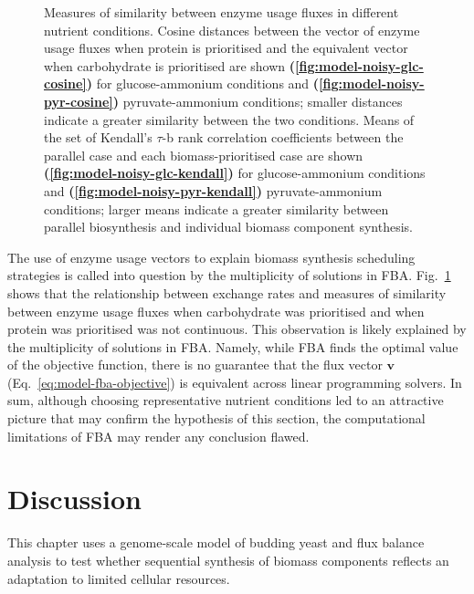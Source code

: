 \begin{figure}
  \caption[
    Measures of similarity between enzyme usage fluxes in different nutrient conditions
  ]{
    Measures of similarity between enzyme usage fluxes in different nutrient conditions.
    Cosine distances between the vector of enzyme usage fluxes when protein is prioritised and the equivalent vector when carbohydrate is prioritised are shown \textbf{(\ref{fig:model-noisy-glc-cosine})} for glucose-ammonium conditions and \textbf{(\ref{fig:model-noisy-pyr-cosine})} pyruvate-ammonium conditions; smaller distances indicate a greater similarity between the two conditions.
    Means of the set of Kendall's $\tau$-b rank correlation coefficients between the parallel case and each biomass-prioritised case are shown \textbf{(\ref{fig:model-noisy-glc-kendall})} for glucose-ammonium conditions and \textbf{(\ref{fig:model-noisy-pyr-kendall})} pyruvate-ammonium conditions; larger means indicate a greater similarity between parallel biosynthesis and individual biomass component synthesis.
    }
  \label{fig:model-noisy}
\end{figure}

The use of enzyme usage vectors to explain biomass synthesis scheduling strategies is called into question by the multiplicity of solutions in FBA.
Fig.\ \ref{fig:model-noisy} shows that the relationship between exchange rates and measures of similarity between enzyme usage fluxes when carbohydrate was prioritised and when protein was prioritised was not continuous.
This observation is likely explained by the multiplicity of solutions in FBA.
Namely, while FBA finds the optimal value of the objective function, there is no guarantee that the flux vector $\mathbf{v}$ (Eq.\ \ref{eq:model-fba-objective}) is equivalent across linear programming solvers.
In sum, although choosing representative nutrient conditions led to an attractive picture that may confirm the hypothesis of this section, the computational limitations of FBA may render any conclusion flawed.


\section{Discussion}
\label{subsec:model-discussion}

This chapter uses a genome-scale model of budding yeast and flux balance analysis to test whether sequential synthesis of biomass components reflects an adaptation to limited cellular resources.

